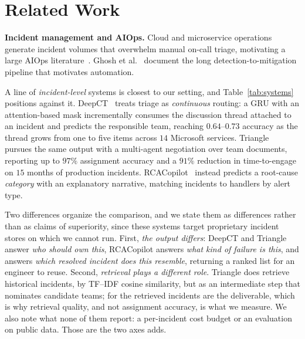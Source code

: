 \section{Related Work}
\label{sec:related}

\noindent\textbf{Incident management and AIOps.} Cloud and microservice operations
generate incident volumes that overwhelm manual on-call triage, motivating a large
AIOps literature~\cite{notaro2021aiops,he2021survey}. Ghosh et al.~\cite{ghosh2022incidents}
document the long detection-to-mitigation pipeline that motivates automation.

A line of \emph{incident-level} systems is closest to our setting, and
Table~\ref{tab:systems} positions \sys{} against it. DeepCT~\cite{chen2019triage}
treats triage as \emph{continuous} routing: a GRU with an attention-based mask
incrementally consumes the discussion thread attached to an incident and predicts
the responsible team, reaching $0.64$--$0.73$ accuracy as the thread grows from
one to five items across $14$ Microsoft services. Triangle~\cite{yu2025triangle}
pursues the same output with a multi-agent negotiation over team documents,
reporting up to $97\%$ assignment accuracy and a $91\%$ reduction in time-to-engage
on $15$ months of production incidents. RCACopilot~\cite{chen2024rcacopilot}
instead predicts a root-cause \emph{category} with an explanatory narrative,
matching incidents to handlers by alert type.

Two differences organize the comparison, and we state them as differences rather
than as claims of superiority, since these systems target proprietary incident
stores on which we cannot run. First, \emph{the output differs}: DeepCT and
Triangle answer \emph{who should own this}, RCACopilot answers \emph{what kind of
failure is this}, and \sys{} answers \emph{which resolved incident does this
resemble}, returning a ranked list for an engineer to reuse. Second,
\emph{retrieval plays a different role}. Triangle does retrieve historical
incidents, by TF--IDF cosine similarity, but as an intermediate step that
nominates candidate teams; for \sys{} the retrieved incidents are the deliverable,
which is why retrieval quality, and not assignment accuracy, is what we measure.
We also note what none of them report: a per-incident cost budget or an
evaluation on public data. Those are the two axes \sys{} adds.

